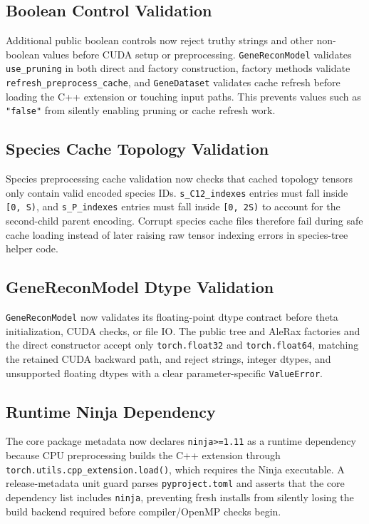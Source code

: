 \documentclass[11pt]{article}
\begin{document}
\subsection{Boolean Control Validation}

Additional public boolean controls now reject truthy strings and other
non-boolean values before CUDA setup or preprocessing.  \texttt{GeneReconModel}
validates \texttt{use\_pruning} in both direct and factory construction,
factory methods validate \texttt{refresh\_preprocess\_cache}, and
\texttt{GeneDataset} validates cache refresh before loading the C++ extension
or touching input paths.  This prevents values such as \texttt{"false"} from
silently enabling pruning or cache refresh work.

\subsection{Species Cache Topology Validation}

Species preprocessing cache validation now checks that cached topology tensors
only contain valid encoded species IDs.  \texttt{s\_C12\_indexes} entries must
fall inside \texttt{[0, S)}, and \texttt{s\_P\_indexes} entries must fall
inside \texttt{[0, 2S)} to account for the second-child parent encoding.
Corrupt species cache files therefore fail during safe cache loading instead
of later raising raw tensor indexing errors in species-tree helper code.

\subsection{GeneReconModel Dtype Validation}

\texttt{GeneReconModel} now validates its floating-point dtype contract before
theta initialization, CUDA checks, or file IO.  The public tree and AleRax
factories and the direct constructor accept only \texttt{torch.float32} and
\texttt{torch.float64}, matching the retained CUDA backward path, and reject
strings, integer dtypes, and unsupported floating dtypes with a clear
parameter-specific \texttt{ValueError}.

\subsection{Runtime Ninja Dependency}

The core package metadata now declares \texttt{ninja>=1.11} as a runtime
dependency because CPU preprocessing builds the C++ extension through
\texttt{torch.utils.cpp\_extension.load()}, which requires the Ninja executable.
A release-metadata unit guard parses \texttt{pyproject.toml} and asserts that
the core dependency list includes \texttt{ninja}, preventing fresh installs from
silently losing the build backend required before compiler/OpenMP checks begin.
\end{document}
